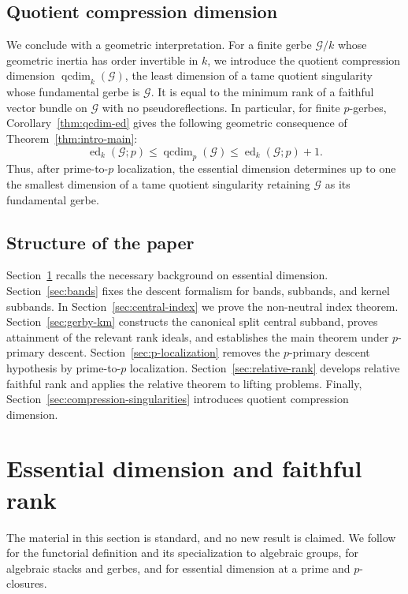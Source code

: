 \documentclass[11pt,reqno]{amsart}
\numberwithin{equation}{section}
\theoremstyle{plain}
\theoremstyle{definition}
\def\cG{{\mathcal G}}
\def\ed{{\operatorname{ed}}}
\begin{document}
\subsection{Quotient compression dimension}
We conclude with a geometric interpretation.  For a finite gerbe
$\cG/k$ whose geometric inertia has order invertible in $k$, we introduce the quotient compression dimension $\operatorname{qcdim}_k(\cG)$,
the least dimension of a tame quotient singularity whose fundamental gerbe
is $\cG$.  It is equal to the minimum rank of a faithful vector bundle on
$\cG$ with no pseudoreflections.  In particular, for finite $p$-gerbes,
Corollary~\ref{thm:qcdim-ed} gives the following geometric consequence of
Theorem~\ref{thm:intro-main}:
\[
\ed_k(\cG;p)
\le
\operatorname{qcdim}_p(\cG)
\le
\ed_k(\cG;p)+1.
\]
Thus, after prime-to-$p$ localization, the essential dimension determines
up to one the smallest dimension of a tame quotient singularity retaining
$\cG$ as its fundamental gerbe.

\subsection{Structure of the paper}

Section~\ref{sec:essential-dimension-background} recalls the necessary
background on essential dimension.  Section~\ref{sec:bands} fixes the
descent formalism for bands, subbands, and kernel subbands.  In
Section~\ref{sec:central-index} we prove the non-neutral index theorem.
Section~\ref{sec:gerby-km} constructs the canonical split central subband,
proves attainment of the relevant rank ideals, and establishes the main
theorem under $p$-primary descent.  Section~\ref{sec:p-localization}
removes the $p$-primary descent hypothesis by prime-to-$p$ localization.
Section~\ref{sec:relative-rank} develops relative faithful rank and applies
the relative theorem to lifting problems.  Finally,
Section~\ref{sec:compression-singularities} introduces quotient compression
dimension.


\section{Essential dimension and faithful rank}
\label{sec:essential-dimension-background}

The material in this section is standard, and no new result is claimed.
We follow \cite[Sections~1 and~2]{BerhuyFavi} for the functorial
definition and its specialization to algebraic groups,
\cite[Sections~2 and~4]{BRV} for algebraic stacks and gerbes, and
\cite[Sections~1 and~3]{LMMRTori} for essential dimension at a prime and
$p$-closures.
\end{document}
